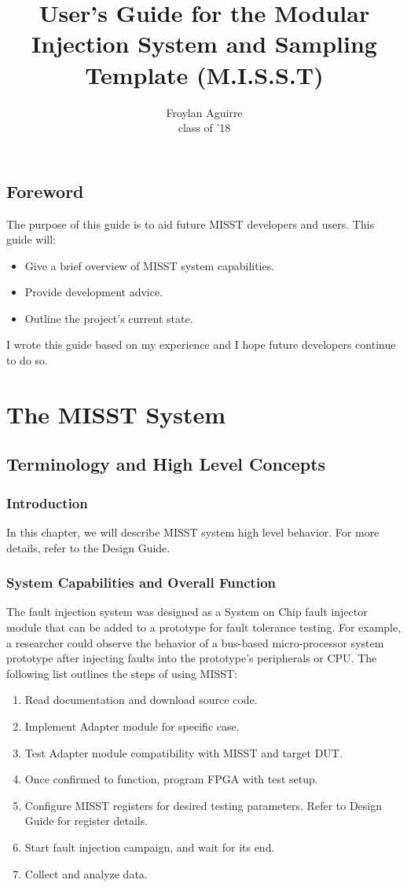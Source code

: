 \documentclass[]{report}
\title{User's Guide for the Modular Injection System and Sampling Template (M.I.S.S.T)}
\author{Froylan Aguirre\\class of '18}
\begin{document}
\maketitle

\chapter*{Foreword}
The purpose of this guide is to aid future MISST developers and users. This guide will:
\begin{itemize}
	\item Give a brief overview of MISST system capabilities.
	\item Provide development advice.
	\item Outline the project's current state.
\end{itemize}

I wrote this guide based on my experience and I hope future developers continue to do so. 

\part{The MISST System}

\chapter{Terminology and High Level Concepts}

\section{Introduction}
\label {introduction}
In this chapter, we will describe MISST system high level behavior. For more details, refer to the Design Guide.

\section{System Capabilities and Overall Function}
\label{system capabilities}
The fault injection system was designed as a System on Chip fault injector module that can be added to a prototype for fault tolerance testing. For example, a researcher could observe the behavior of a bus-based micro-processor system prototype after injecting faults into the prototype's peripherals or CPU. 
The following list outlines the steps of using MISST:
\begin{enumerate}
	\item Read documentation and download source code.
	\item Implement Adapter module for specific case.
	\item Test Adapter module compatibility with MISST and target DUT.
	\item Once confirmed to function, program FPGA with test setup.
	\item Configure MISST registers for desired testing parameters. Refer to Design Guide for register details.
	\item Start fault injection campaign, and wait for its end.
	\item Collect and analyze data.
\end{enumerate}
\end{document}
